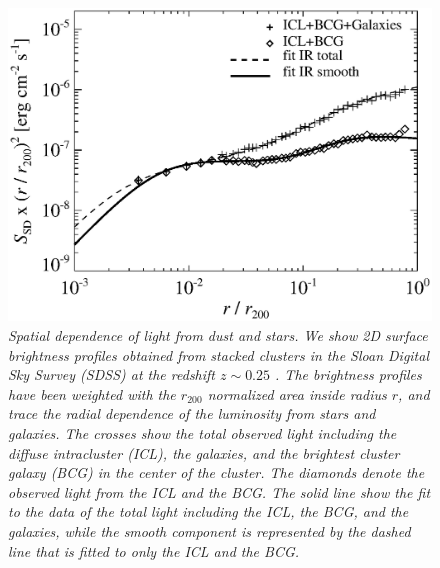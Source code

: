 \documentclass[10pt,aps,pra,reprint,amsmath,amsfonts,amssymb,showpacs]{revtex4-1}
\newcommand{\rvir}{r_{200}}
\begin{document}
\begin{figure}%
 \includegraphics[width=0.99\columnwidth]{figures/SB.photon.eps}
\caption{\it Spatial dependence of light from dust and stars. We show
  2D surface brightness profiles obtained from stacked clusters in the
  Sloan Digital Sky Survey (SDSS) at the redshift $z \sim 0.25$
  \cite{2005MNRAS.358..949Z}. The brightness profiles have been
  weighted with the $\rvir$ normalized area inside radius $r$, and
  trace the radial dependence of the luminosity from stars and
  galaxies. The crosses show the total observed light including the
  diffuse intracluster (ICL), the galaxies, and the brightest cluster
  galaxy (BCG) in the center of the cluster. The diamonds denote the
  observed light from the ICL and the BCG. The solid line show the fit
  to the data of the total light including the ICL, the BCG, and the
  galaxies, while the smooth component is represented by the dashed
  line that is fitted to only the ICL and the BCG.}
 \label{fig3}
\end{figure}
\end{document}
